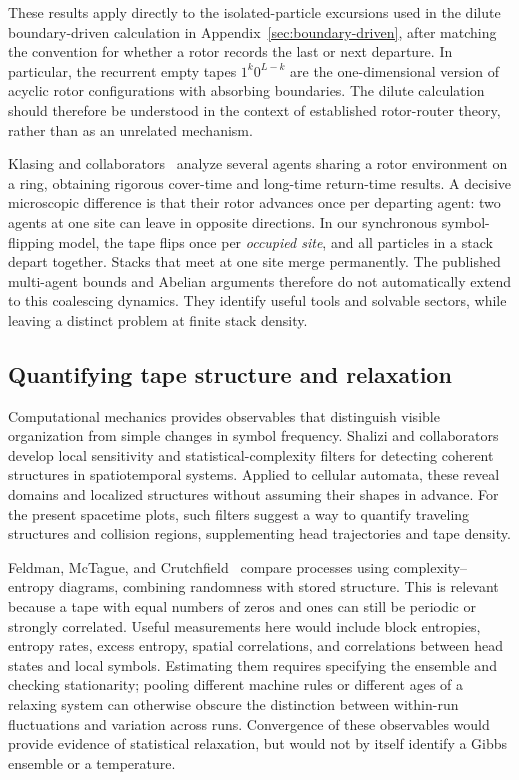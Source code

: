 \documentclass{article}
\begin{document}
These results apply directly to the isolated-particle excursions used in
the dilute boundary-driven calculation in
Appendix~\ref{sec:boundary-driven}, after matching the convention for
whether a rotor records the last or next departure.  In particular, the
recurrent empty tapes $1^k0^{L-k}$ are the one-dimensional version of
acyclic rotor configurations with absorbing boundaries.  The dilute
calculation should therefore be understood in the context of established
rotor-router theory, rather than as an unrelated mechanism.

Klasing and collaborators~\citep{klasing2017ring} analyze several agents
sharing a rotor environment on a ring, obtaining rigorous cover-time and
long-time return-time results.  A decisive microscopic difference is that
their rotor advances once per departing agent: two agents at one site can
leave in opposite directions.  In our synchronous symbol-flipping model,
the tape flips once per \emph{occupied site}, and all particles in a stack
depart together.  Stacks that meet at one site merge permanently.  The
published multi-agent bounds and Abelian arguments therefore do not
automatically extend to this coalescing dynamics.  They identify useful
tools and solvable sectors, while leaving a distinct problem at finite
stack density.

\subsection{Quantifying tape structure and relaxation}

Computational mechanics provides observables that distinguish visible
organization from simple changes in symbol frequency.  Shalizi and
collaborators~\citep{shalizi2006filters} develop local sensitivity and
statistical-complexity filters for detecting coherent structures in
spatiotemporal systems.  Applied to cellular automata, these reveal domains
and localized structures without assuming their shapes in advance.  For
the present spacetime plots, such filters suggest a way to quantify
traveling structures and collision regions, supplementing head trajectories
and tape density.

Feldman, McTague, and Crutchfield~\citep{feldman2008complexity} compare
processes using complexity--entropy diagrams, combining randomness with
stored structure.  This is relevant because a tape with equal numbers of
zeros and ones can still be periodic or strongly correlated.  Useful
measurements here would include block entropies, entropy rates, excess
entropy, spatial correlations, and correlations between head states and
local symbols.  Estimating them requires specifying the ensemble and
checking stationarity; pooling different machine rules or different ages
of a relaxing system can otherwise obscure the distinction between
within-run fluctuations and variation across runs.  Convergence of these
observables would provide evidence of statistical relaxation, but would not by
itself identify a Gibbs ensemble or a temperature.
\end{document}
